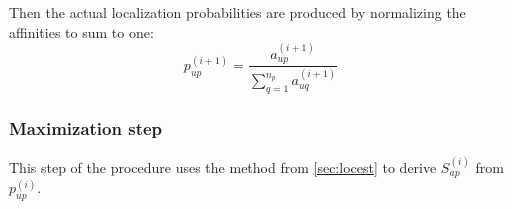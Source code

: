 \documentclass[a4paper]{article}
\begin{document}
Then the actual localization probabilities are produced by normalizing the
affinities to sum to one:
\begin{equation}
p_{up}^{(i+1)} = \frac
    {a_{up}^{(i+1)}}
    {\sum_{q=1}^{n_p} a_{uq}^{(i+1)}}
\end{equation}

\subsubsection{Maximization step}
This step of the procedure uses the method from
\ref{sec:locest} to derive $S_{ap}^{(i)}$ from $p_{up}^{(i)}$.
\end{document}
